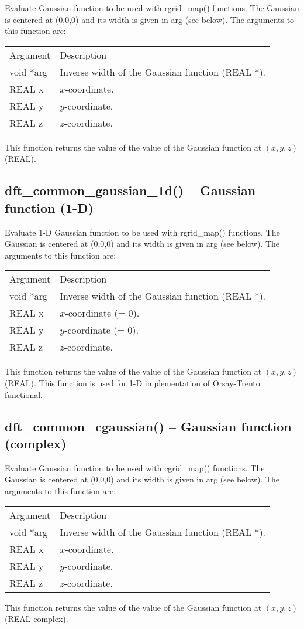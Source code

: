 \documentclass[12pt,letterpaper]{report}
\begin{document}
Evaluate Gaussian function to be used with rgrid\_map() functions. The Gaussian is centered at (0,0,0) and its width is given in arg (see below). The arguments to this function are:
\begin{longtable}{p{} p{}}
Argument & Description\\
\cline{1-2}
void *arg & Inverse width of the Gaussian function (REAL *).\\
REAL x & $x$-coordinate.\\
REAL y & $y$-coordinate.\\
REAL z & $z$-coordinate.\\
\end{longtable}
\noindent
This function returns the value of the value of the Gaussian function at $(x, y, z)$ (REAL).

\subsection{dft\_common\_gaussian\_1d() -- Gaussian function (1-D)}

Evaluate 1-D Gaussian function to be used with rgrid\_map() functions. The Gaussian is centered at (0,0,0) and its width is given in arg (see below). The arguments to this function are:
\begin{longtable}{p{} p{}}
Argument & Description\\
\cline{1-2}
void *arg & Inverse width of the Gaussian function (REAL *).\\
REAL x & $x$-coordinate (= 0).\\
REAL y & $y$-coordinate (= 0).\\
REAL z & $z$-coordinate.\\
\end{longtable}
\noindent
This function returns the value of the value of the Gaussian function at $(x, y, z)$ (REAL). This function is used for 1-D implementation of Orsay-Trento functional.

\subsection{dft\_common\_cgaussian() -- Gaussian function (complex)}

Evaluate Gaussian function to be used with cgrid\_map() functions. The Gaussian is centered at (0,0,0) and its width is given in arg (see below). The arguments to this function are:
\begin{longtable}{p{} p{}}
Argument & Description\\
\cline{1-2}
void *arg & Inverse width of the Gaussian function (REAL *).\\
REAL x & $x$-coordinate.\\
REAL y & $y$-coordinate.\\
REAL z & $z$-coordinate.\\
\end{longtable}
\noindent
This function returns the value of the value of the Gaussian function at $(x, y, z)$ (REAL complex).
\end{document}
